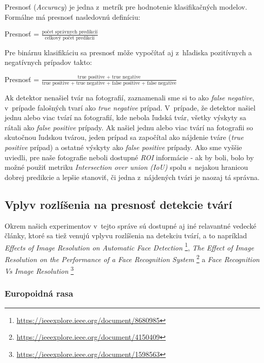 \documentclass[]{article}
\newcommand*\textfrac[2]{
	\frac{\text{#1}}{\text{#2}}
}
\begin{document}
	Presnosť (\textit{Accuracy}) je jedna z~metrík pre hodnotenie klasifikačných modelov. Formálne má presnosť nasledovnú definíciu:
	\begin{center}
		Presnosť = $\textfrac{počet správnych predikcií}{celkový počet predikcií}$
	\end{center}
	Pre binárnu klasifikáciu sa presnosť môže vypočítať aj z~hľadiska pozitívnych a negatívnych prípadov takto:
	\begin{center}
		Presnosť = $\textfrac{true positive + true negative}{true positive + true negative + false positive + false negative}$
	\end{center}
	Ak detektor nenašiel tvár na fotografií, zaznamenali sme si to ako \textit{false negative}, v~prípade falošných tvarí ako \textit{true negative} prípad. V~prípade, že detektor našiel jednu alebo viac tvárí na fotografií, kde nebola ľudská tvár, všetky výskyty sa rátali ako \textit{false positive} prípady. Ak našiel jednu alebo viac tvárí na fotografii so skutočnou ľudskou tvárou, jeden prípad sa započítal ako nájdenie tváre (\textit{true positive} prípad) a ostatné výskyty ako \textit{false positive} prípady. Ako sme vyššie uviedli, pre naše fotografie neboli dostupné \textit{ROI} informácie \-- ak by boli, bolo by možné použiť metriku \textit{Intersection over union (IoU)} spolu s~nejakou hranicou dobrej predikcie a lepšie stanoviť, či jedna z~nájdených tvári je naozaj tá správna.
	
	
	\subsection*{Vplyv rozlíšenia na presnosť detekcie tvárí}
	
	Okrem našich experimentov v~tejto správe sú dostupné aj iné relavantné vedecké články, ktoré sa tiež venujú vplyvu rozlíšenia na detekciu tvárí, a to napríklad \textit{Effects of Image Resolution on Automatic Face Detection} \footnote{\url{https://ieeexplore.ieee.org/document/8680985}}, \textit{The Effect of Image Resolution on the Performance of a Face Recognition System} \footnote{\url{https://ieeexplore.ieee.org/document/4150409}} a \textit{Face Recognition Vs Image Resolution} \footnote{\url{https://ieeexplore.ieee.org/document/1598563}}
	
	\subsubsection*{Europoidná rasa}
	
\end{document}
